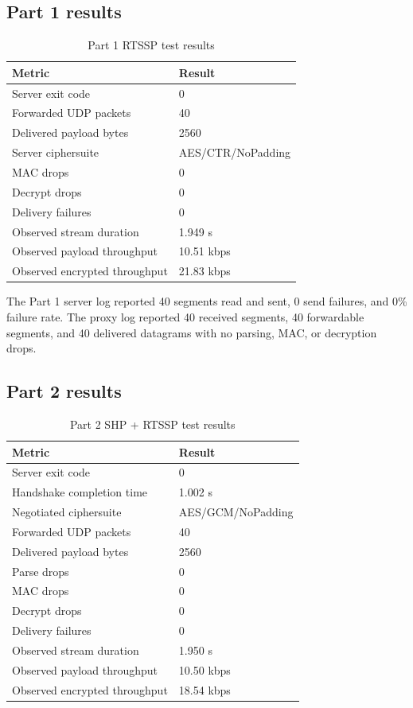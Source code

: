 \documentclass[11pt,a4paper]{article}
\begin{document}
\subsection{Part 1 results}
\begin{table}[h]
\centering
\begin{tabular}{@{}ll@{}}
\toprule
Metric & Result \\
\midrule
Server exit code & 0 \\
Forwarded UDP packets & 40 \\
Delivered payload bytes & 2560 \\
Server ciphersuite & AES/CTR/NoPadding \\
MAC drops & 0 \\
Decrypt drops & 0 \\
Delivery failures & 0 \\
Observed stream duration & 1.949 s \\
Observed payload throughput & 10.51 kbps \\
Observed encrypted throughput & 21.83 kbps \\
\bottomrule
\end{tabular}
\caption{Part 1 RTSSP test results}
\end{table}

The Part 1 server log reported 40 segments read and sent, 0 send failures, and 0\% failure rate. The proxy log reported 40 received segments, 40 forwardable segments, and 40 delivered datagrams with no parsing, MAC, or decryption drops.

\subsection{Part 2 results}
\begin{table}[h]
\centering
\begin{tabular}{@{}ll@{}}
\toprule
Metric & Result \\
\midrule
Server exit code & 0 \\
Handshake completion time & 1.002 s \\
Negotiated ciphersuite & AES/GCM/NoPadding \\
Forwarded UDP packets & 40 \\
Delivered payload bytes & 2560 \\
Parse drops & 0 \\
MAC drops & 0 \\
Decrypt drops & 0 \\
Delivery failures & 0 \\
Observed stream duration & 1.950 s \\
Observed payload throughput & 10.50 kbps \\
Observed encrypted throughput & 18.54 kbps \\
\bottomrule
\end{tabular}
\caption{Part 2 SHP + RTSSP test results}
\end{table}
\end{document}
